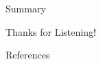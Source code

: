 \documentclass[usenames,dvipsnames,mathserif,notheorems]{beamer}
\begin{document}
\begin{frame}{Summary}

\end{frame}



\begin{frame}{}
	\begin{center}
		\huge Thanks for Listening!
	\end{center}
\end{frame}

\begin{frame}[allowframebreaks]{References}
	\printbibliography[]
\end{frame}
\end{document}
